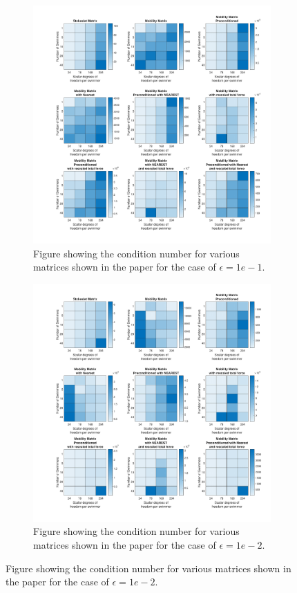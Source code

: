  \begin{figure}
     \centering
     \begin{subfigure}[b]{0.49\textwidth}
         \includegraphics[height=0.49\textheight,keepaspectratio]{Images/Condition/Condition-1.pdf}
         \caption{Figure showing the condition number for various matrices shown in the paper for the case of $\epsilon=1e-1$.}
         \label{fig:Condition1}
     \end{subfigure}
     \hfill
     \begin{subfigure}[b]{0.49\textheight}
         \includegraphics[height=0.49\textheight,keepaspectratio]{Images/Condition/Condition-2.pdf}
         \caption{Figure showing the condition number for various matrices shown in the paper for the case of $\epsilon=1e-2$.}
         \label{fig:Condition2}
     \end{subfigure}
\end{figure}
